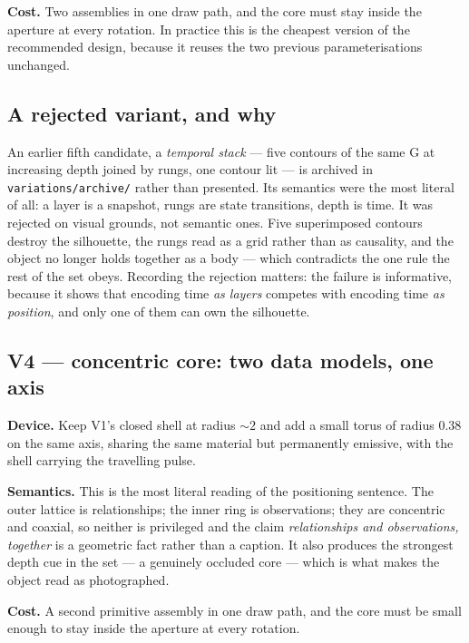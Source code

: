 \documentclass[11pt,a4paper]{article}
\begin{document}
\noindent
\textbf{Cost.} Two assemblies in one draw path, and the core must stay inside
the aperture at every rotation. In practice this is the cheapest version of the
recommended design, because it reuses the two previous parameterisations
unchanged.

\subsection*{A rejected variant, and why}

\noindent
An earlier fifth candidate, a \emph{temporal stack} --- five contours of the
same G at increasing depth joined by rungs, one contour lit --- is archived in
\texttt{variations/archive/} rather than presented. Its semantics were the most
literal of all: a layer is a snapshot, rungs are state transitions, depth is
time. It was rejected on visual grounds, not semantic ones. Five superimposed
contours destroy the silhouette, the rungs read as a grid rather than as
causality, and the object no longer holds together as a body --- which
contradicts the one rule the rest of the set obeys. Recording the rejection
matters: the failure is informative, because it shows that encoding time
\emph{as layers} competes with encoding time \emph{as position}, and only one
of them can own the silhouette.

\subsection*{V4 --- concentric core: two data models, one axis}

\noindent
\textbf{Device.} Keep V1's closed shell at radius $\sim2$ and add a small torus
of radius $0.38$ on the same axis, sharing the same material but permanently
emissive, with the shell carrying the travelling pulse.

\noindent
\textbf{Semantics.} This is the most literal reading of the positioning
sentence. The outer lattice is relationships; the inner ring is observations;
they are concentric and coaxial, so neither is privileged and the claim
\emph{relationships and observations, together} is a geometric fact rather than
a caption. It also produces the strongest depth cue in the set --- a genuinely
occluded core --- which is what makes the object read as photographed.

\noindent
\textbf{Cost.} A second primitive assembly in one draw path, and the core must be
small enough to stay inside the aperture at every rotation.
\end{document}
